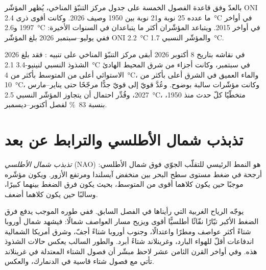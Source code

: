 بالعدّ وفق قاعدة الفصول الخمسة على جدول مركز التنبّؤ المناخي، يُظهر المؤشّر ONI ما عدده 25
نوبة  و21 نوبة  بين 1950 وصيف 2026. وكانت أقوى ذرى 
\qty{2.4}{\celsius} في أواخر 1997 و\qty{2.6}{\celsius} في أواخر 2015. ويتباعد المؤشّران
أكثر ما يتباعدان في السنوات الأخيرة: ففي يوليو--سبتمبر 2026 بلغ المؤشّر ONI \qty{2.2}{\celsius}
والمؤشّر النسبي \qty{1.7}{\celsius}.

\begin{dated}{2026}
في نقاشه بتاريخ 8 أكتوبر 2026 أبقى مركز التنبّؤ المناخي على تنبيه : فقد
بلغ الشذوذ النسبي لنينيو-3.4 \qty{+2.1}{\celsius} في سبتمبر، وكانت أجزاء من شرق
المحيط الهادئ الاستوائي أعلى من المتوسط بأكثر من \qty{4}{\celsius}، والماء العميق في الشرق
أعلى بأكثر من \qty{10}{\celsius}، وكانت مؤشّرات  سالبة
بوضوح. وعُدَّ
 قويّ إلى قويّ جدًّا مرجّحًا حتى يناير--مارس 2027، وقُدِّر احتمال
أن يتجاوز المؤشّر النسبي \qty{2.5}{\celsius}، متخطّيًا كلّ حدث منذ 1950، بنسبة
\qty{83}{\percent} لفصل أكتوبر--ديسمبر.
\end{dated}

\section{تذبذب شمال الأطلسي والترابط عن بعد}\label{sec:b2:climate-variability:nao}

\begin{definition}\label{def:b2:climate-variability:nao}
\emph{تذبذب شمال الأطلسي} (NAO) هو النمط الرئيسي
للتقلّب الجوّي فوق شمال الأطلسي: أرجحة في ضغط مستوى سطح البحر بين
منخفض آيسلندا ومرتفع الأزور. ويكون مؤشّره موجبًا حين يكون كلاهما أقوى من المتوسط، بحيث
يكون فرق الضغط بينهما كبيرًا، وسالبًا حين يكون كلاهما أضعف.
\end{definition}

يوجّه  الرياح الغربية التي رأيناها في الفصل السابق. ففي طوره الموجب يدفع فرق الضغط
الأكبر تيّارًا نفّاثًا أطلسيًّا أقوى ويزيح مسار العواصف شمالًا: فيشهد شمال أوروبا
شتاءً أكثر عواصف ومطرًا واعتدالًا، وجنوب أوروبا شتاءً أجفّ، وشرق أمريكا الشمالية
اندفاعات أقلّ للهواء البارد، وغرينلاند شتاءً أبرد. والطور السالب يعكس حالات
الشذوذ هذه. وفي أواخر القرن الثامن عشر لاحظ مبشّر أن فصول الشتاء المعتدلة في
غرينلاند تأتي مع فصول شتاء قاسية في الدنمارك، والعكس.

